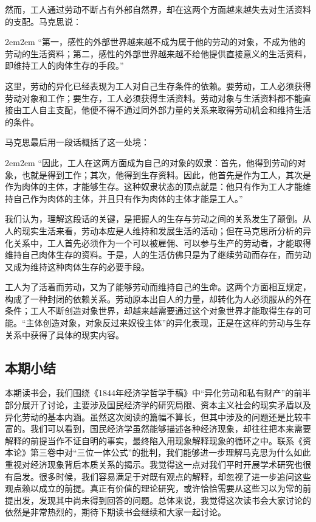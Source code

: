 \documentclass[a4paper,twoside,12pt,AutoFakeBold]{ctexart}
\begin{document}
然而，工人通过劳动不断占有外部自然界，却在这两个方面越来越失去对生活资料的支配。马克思说：

\begin{adjustwidth}{2em}{2em}
\qquad\fangsong
“第一，感性的外部世界越来越不成为属于他的劳动的对象，不成为他的劳动的生活资料；第二，感性的外部世界越来越不给他提供直接意义的生活资料，即维持工人的肉体生存的手段。”
\end{adjustwidth}

这里，劳动的异化已经表现为工人对自己生存条件的依赖。要劳动，工人必须获得劳动对象和工作；要生存，工人必须获得生活资料。劳动对象与生活资料都不能直接由工人自主支配，他便不得不通过同外部力量的关系来取得劳动机会和维持生活的条件。

马克思最后用一段话概括了这一处境：

\begin{adjustwidth}{2em}{2em}
\qquad\fangsong
“因此，工人在这两方面成为自己的对象的奴隶：首先，他得到劳动的对象，也就是得到工作；其次，他得到生存资料。因此，他首先是作为工人，其次是作为肉体的主体，才能够生存。这种奴隶状态的顶点就是：他只有作为工人才能维持自己作为肉体的主体，并且只有作为肉体的主体才能是工人。”
\end{adjustwidth}

我们认为，理解这段话的关键，是把握人的生存与劳动之间的关系发生了颠倒。从人的现实生活来看，劳动本应是人维持和发展生活的活动；但在马克思所分析的异化关系中，工人首先必须作为一个可以被雇佣、可以参与生产的劳动者，才能取得维持自己肉体生存的资料。于是，人的生活仿佛只是为了继续劳动而存在，而劳动又成为维持这种肉体生存的必要手段。

工人为了活着而劳动，又为了能够劳动而维持自己的生命。这两个方面相互规定，构成了一种封闭的依赖关系。劳动原本出自人的力量，却转化为人必须服从的外在条件；工人不断创造对象世界，却越来越需要通过这个对象世界才能取得生存的可能。“主体创造对象，对象反过来奴役主体”的异化表现，正是在这样的劳动与生存关系中获得了具体的现实内容。

\subsection{本期小结}
本期读书会，我们围绕《1844年经济学哲学手稿》中“异化劳动和私有财产”的前半部分展开了讨论，主要涉及国民经济学的研究局限、资本主义社会的现实矛盾以及异化劳动的基本内涵。虽然这次阅读的篇幅不算长，但其中涉及的问题还是比较丰富的。我们可以看到，国民经济学虽然能够描述各种经济现象，却往往把本来需要解释的前提当作不证自明的事实，最终陷入用现象解释现象的循环之中。联系《资本论》第三卷中对“三位一体公式”的批判，我们能够进一步理解马克思为什么如此重视对经济现象背后本质关系的揭示。我觉得这一点对我们平时开展学术研究也很有启发。很多时候，我们容易满足于对既有观点的解释，却忽视了进一步追问这些观点赖以成立的前提。真正有价值的理论研究，或许恰恰需要从这些习以为常的前提出发，发现其中尚未得到回答的问题。总体来说，我觉得这次读书会大家讨论的依然是非常热烈的，期待下期读书会继续和大家一起讨论。
\end{document}
